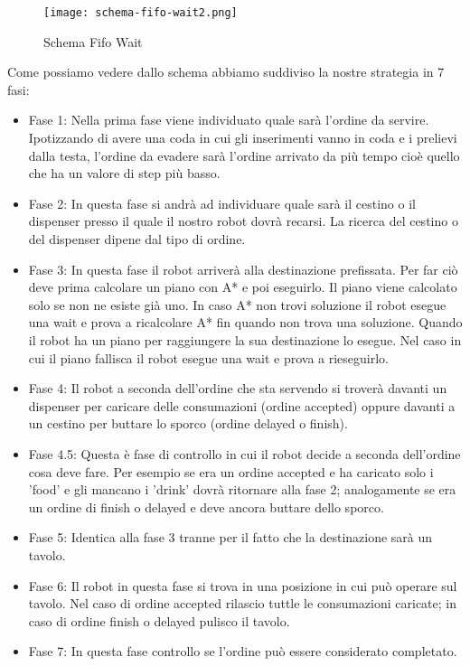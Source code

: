 \begin{figure}[htp]
  \texttt{[image: schema-fifo-wait2.png]}
  \caption{Schema Fifo Wait}
  \label{fig:figure2}
\end{figure}

Come possiamo vedere dallo schema abbiamo suddiviso la nostre strategia in 7 fasi:
\begin{itemize}
  \item Fase 1: Nella prima fase viene individuato quale sarà l'ordine da servire. Ipotizzando di avere una coda in cui gli inserimenti vanno in coda e i prelievi dalla testa, l'ordine da evadere sarà l'ordine arrivato da più tempo cioè quello che ha un valore di step più basso.
  \item Fase 2: In questa fase si andrà ad individuare quale sarà il cestino o il dispenser presso il quale il nostro robot dovrà recarsi. La ricerca del cestino o del dispenser dipene dal tipo di ordine.
  \item Fase 3: In questa fase il robot arriverà alla destinazione prefissata. Per far ciò deve prima calcolare un piano con A* e poi eseguirlo. Il piano viene calcolato solo se non ne esiste già uno. In caso A* non trovi soluzione il robot esegue una wait e prova a ricalcolare A* fin quando non trova una soluzione.
  Quando il robot ha un piano per raggiungere la sua destinazione lo esegue. Nel caso in cui il piano fallisca il robot esegue una wait e prova a rieseguirlo.
  \item Fase 4: Il robot a seconda dell'ordine che sta servendo si troverà davanti un dispenser per caricare delle consumazioni (ordine accepted) oppure davanti a un cestino per buttare lo sporco (ordine delayed o finish).
  \item Fase 4.5: Questa è fase di controllo in cui il robot decide a seconda dell'ordine cosa deve fare. Per esempio se era un ordine accepted e ha caricato solo i 'food' e gli mancano i 'drink' dovrà ritornare alla fase 2; analogamente se era un ordine di finish o delayed e deve ancora buttare dello sporco.
  \item Fase 5: Identica alla fase 3 tranne per il fatto che la destinazione sarà un tavolo.
  \item Fase 6: Il robot in questa fase si trova in una posizione in cui può operare sul tavolo. Nel caso di ordine accepted rilascio tuttle le consumazioni caricate; in caso di ordine finish o delayed pulisco il tavolo.
  \item Fase 7: In questa fase controllo se l'ordine può essere considerato completato.
\end{itemize}

